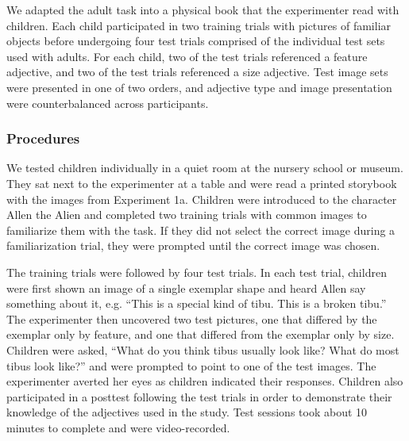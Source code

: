 \documentclass[10pt,letterpaper]{article}
\begin{document}
We adapted the adult task into a physical book that the experimenter read with children.  Each child participated in two training trials with pictures of familiar objects before undergoing four test trials comprised of the individual test sets used with adults.  For each child, two of the test trials referenced a feature adjective, and two of the test trials referenced a size adjective.  Test image sets were presented in one of two orders, and adjective type and image presentation were counterbalanced across participants. 


\subsubsection{Procedures}

We tested children individually in a quiet room at the nursery school or museum.  They sat next to the experimenter at a table and were read a printed storybook with the images from Experiment 1a.  Children were introduced to the character Allen the Alien and completed two training trials with common images to familiarize them with the task. %
If they did not select the correct image during a familiarization trial, they were prompted until the correct image was chosen.

The training trials were followed by four test trials.  In each test trial, children were first shown an image of a single exemplar shape and heard Allen say something about it, e.g. ``This is a special kind of tibu. This is a broken tibu.''  The experimenter then uncovered two test pictures, one that differed by the exemplar only by feature, and one that differed from the exemplar only by size.  Children were asked, ``What do you think tibus usually look like? What do most tibus look like?'' and were prompted to point to one of the test images.  The experimenter averted her eyes as children indicated their responses. 
Children also participated in a posttest following the test trials in order to demonstrate their knowledge of the adjectives used in the study.  Test sessions took about 10 minutes to complete and were video-recorded.  
\end{document}
